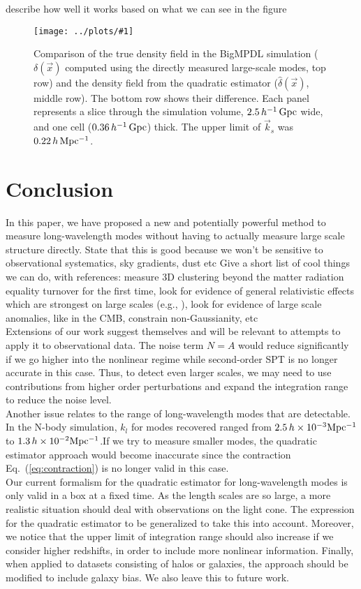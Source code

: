 \documentclass[prd,amsmath,amssymb,floatfix,superscriptaddress,nofootinbib,twocolumn]{revtex4-1}
\newcommand{\vk}{\vec{k}}
\newcommand{\ec}[1]{Eq.~(\ref{eq:#1})}
\newcommand{\sfigg}[2]{
\texttt{[image: ../plots/\#1]}
        }
\newcommand{\Sfigg}[2]{
   \begin{figure}[thbp]
    \sfigg{../plots/#1.pdf}{\columnwidth}
    \caption{{\small #2}}
    \label{fig:#1}
   \end{figure}
}
\newcommand{\RC}[1]{{\color{darkorange} #1}}
\begin{document}
\RC{describe how well it works based on what we can see in the figure}
\Sfigg{real}{Comparison of the true density field in the BigMPDL simulation ($\delta(\vec{x})$ computed using the directly measured large-scale modes, top row) and the density field from the quadratic estimator ($\hat{\delta}(\vec{x})$, middle row). The bottom row shows their difference. Each panel represents a slice through the simulation volume,  $2.5 \,h^{-1}\,\rm Gpc$ wide, and one cell ($0.36 \,h^{-1}\,\rm Gpc$) thick.  The upper limit of $\vk_s$ was $0.22 \,h\, \rm Mpc^{-1}$.}


\section{Conclusion}\label{sec4}
In this paper, we have proposed a new and potentially powerful method to measure long-wavelength modes without having to actually measure large scale structure directly.
\RC{ State that this is good because we won't be sensitive to observational systematics, sky gradients, dust etc}
\RC{Give a short list of cool things we can do, with references: measure 3D clustering beyond the matter radiation equality turnover for the first time, look for evidence of general relativistic effects which are strongest on large scales (e.g., \cite{Jeong:2012ls}), look for evidence of large scale anomalies, like in the CMB, constrain non-Gaussianity,  etc }\\
Extensions of our work suggest themselves and will be relevant to attempts to apply it to observational data. The noise term $N=A$ would reduce significantly if we go higher into the nonlinear regime while second-order SPT is no longer accurate in this case. Thus, to detect even larger scales, we may need to use contributions from higher order perturbations and expand the integration range to reduce the noise level. \\
Another issue relates to the range of long-wavelength modes that are detectable. In the N-body simulation,  $k_l$ for modes recovered ranged from $2.5 \,h \times 10^{-3}  \rm Mpc^{-1}$ to $1.3\,h\times 10^{-2}  \rm Mpc^{-1}$.If we try to measure smaller modes, the quadratic estimator approach would become inaccurate since the contraction \ec{contraction} is no longer valid in this case.\\ 
Our current formalism for the quadratic estimator for long-wavelength modes is only valid in a box at a fixed time. As the length scales are so large, a more realistic situation should deal with observations on the light cone. The expression for the quadratic estimator to be generalized to take this into account. Moreover, we notice that the upper limit of integration range should also increase if we consider higher redshifts, in order to include more nonlinear information. Finally, when applied to datasets consisting of halos or galaxies, the approach should be modified to include galaxy bias. We also leave this to future work.\\ 
\end{document}
